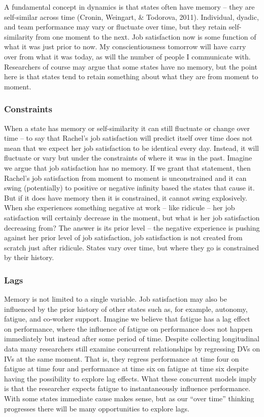 \documentclass[english,,man]{apa6}
\begin{document}
A fundamental concept in dynamics is that states often have memory -- they are self-similar across time (Cronin, Weingart, \& Todorova, 2011). Individual, dyadic, and team performance may vary or fluctuate over time, but they retain self-similarity from one moment to the next. Job satisfaction now is some function of what it was just prior to now. My conscientiousness tomorrow will have carry over from what it was today, as will the number of people I communicate with. Researchers of course may argue that some states have no memory, but the point here is that states tend to retain something about what they are from moment to moment.

\hypertarget{constraints}{%
\subsubsection{Constraints}\label{constraints}}

When a state has memory or self-similarity it can still fluctuate or change over time -- to say that Rachel's job satisfaction will predict itself over time does not mean that we expect her job satisfaction to be identical every day. Instead, it will fluctuate or vary but under the constraints of where it was in the past. Imagine we argue that job satisfaction has no memory. If we grant that statement, then Rachel's job satisfaction from moment to moment is unconstrained and it can swing (potentially) to positive or negative infinity based the states that cause it. But if it does have memory then it is constrained, it cannot swing explosively. When she experiences something negative at work -- like ridicule -- her job satisfaction will certainly decrease in the moment, but what is her job satisfaction decreasing from? The answer is its prior level -- the negative experience is pushing against her prior level of job satisfaction, job satisfaction is not created from scratch just after ridicule. States vary over time, but where they go is constrained by their history.

\hypertarget{lags}{%
\subsubsection{Lags}\label{lags}}

Memory is not limited to a single variable. Job satisfaction may also be influenced by the prior history of other states such as, for example, autonomy, fatigue, and co-worker support. Imagine we believe that fatigue has a lag effect on performance, where the influence of fatigue on performance does not happen immediately but instead after some period of time. Despite collecting longitudinal data many researchers still examine concurrent relationships by regressing DVs on IVs at the same moment. That is, they regress performance at time four on fatigue at time four and performance at time six on fatigue at time six despite having the possibility to explore lag effects. What these concurrent models imply is that the researcher expects fatigue to instantaneously influence performance. With some states immediate cause makes sense, but as our \enquote{over time} thinking progresses there will be many opportunities to explore lags.
\end{document}

